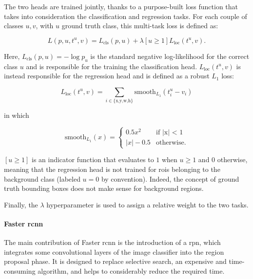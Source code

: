 \documentclass[%
    corpo=12pt,
    twoside,
    stile=classica,   
    tipotesi=magistrale,
    evenboxes,
    english,
	numerazioneromana,
]{toptesi}
\begin{document}
The two heads are trained jointly, thanks to a purpose-built loss function that takes into consideration the classification and regression tasks. For each couple of classes $u, v$, with $u$ ground truth class, this multi-task loss is defined as:

\begin{equation}
	L(p,u,t^u,v) = L_{\text{cls}}(p,u) + \lambda\left[u\geq1\right]L_{\text{loc}}(t^u,v).
\end{equation}

Here, $L_{\text{cls}}(p,u) = -\log{p_u}$ is the standard negative log-likelihood for the correct class $u$ and is responsible for the training the classification head. $L_{\text{loc}}(t^u,v)$ is instead responsible for the regression head and is defined as a robust $L_1$ loss:

\begin{equation*}
	L_{\text{loc}}(t^u,v) = \sum_{i\in \text{\{x,y,w,h\}}}\text{smooth}_{L_1}(t_i^u - v_i)
\end{equation*}

in which

\begin{equation*}
	\text{smooth}_{L_1}(x) = \begin{cases}
		0.5x^2 & \text{if |x| < 1}\\
		|x| - 0.5 & \text{otherwise.}
		\end{cases}
\end{equation*}

$\left[u\geq1\right]$ is an indicator function that evaluates to $1$ when $u\geq1$ and $0$ otherwise, meaning that the regression head is not trained for \glspl{roi} belonging to the background class (labeled $u=0$ by convention). Indeed, the concept of ground truth bounding boxes does not make sense for background regions.

Finally, the $\lambda$ hyperparameter is used to assign a relative weight to the two tasks.

\paragraph{Faster \gls{rcnn}}
The main contribution of Faster \gls{rcnn} is the introduction of a \gls{rpn}, which integrates some convolutional layers of the image classifier into the region proposal phase. It is designed to replace selective search, an expensive and time-consuming algorithm, and helps to considerably reduce the required time.

\end{document}
